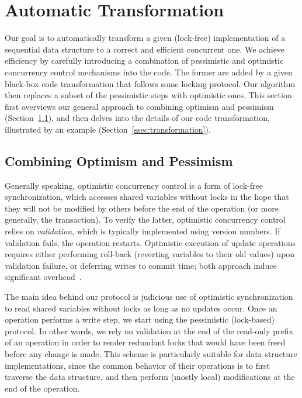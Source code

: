 \section{Automatic Transformation}\label{sec:algorithm}

Our goal is to automatically transform a given (lock-free) implementation of a sequential data structure to a correct and efficient concurrent one.
We achieve efficiency by carefully introducing a combination of pessimistic and optimistic concurrency control mechanisms into the code. The former are 
added by a given black-box code transformation that follows some locking protocol. Our algorithm then replaces a subset of the pessimistic
steps with optimistic ones. This section first overviews our general approach to combining optimism and pessimism (Section~\ref{ssec:overview}), and
then delves into the details of our code transformation, illustrated by an example (Section~\ref{ssec:transformation}).

\subsection{Combining Optimism and Pessimism}\label{ssec:overview}

Generally speaking, optimistic concurrency control is a form of lock-free synchronization, which accesses shared variables without locks in the hope that they will not be modified by others before the end of the operation (or more generally, the transaction). To verify the latter, optimistic concurrency control relies on \emph{validation}, which is typically implemented using version numbers. If validation fails, the operation restarts. Optimistic execution of update operations requires either performing roll-back (reverting variables to their old values) upon validation failure, or deferring writes to commit time; both approach induce significant overhead~\cite{Cascaval:2008}. 


The main idea behind our protocol is judicious use of optimistic synchronization to read 
shared variables without locks as long as no updates occur. Once an operation
performs a write step, we start using the pessimistic (lock-based) protocol. In
other words, we rely on validation at the end of the read-only prefix of an operation in order to render redundant 
locks that would have been freed
before any change is made.
This scheme is particularly suitable for data structure implementations,
since the common behavior of their operations 
is to first traverse the data structure, and then 
perform (mostly local) modifications at the end of the operation.


